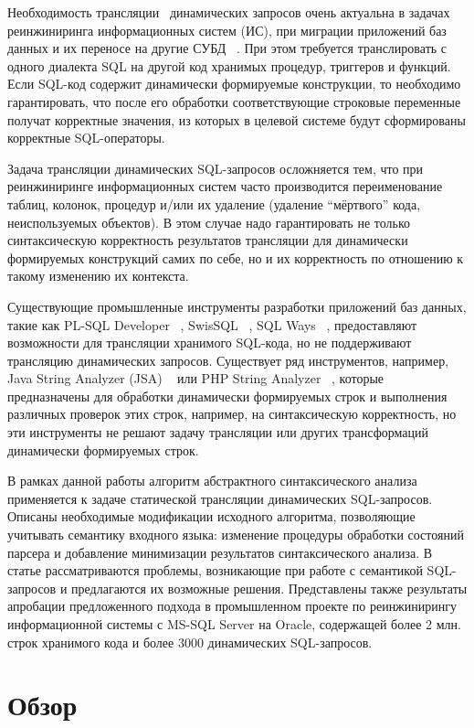 \documentclass{llncs}
\begin{document}
Необходимость трансляции~\cite{mart} динамических запросов очень актуальна в задачах реинжиниринга информационных систем (ИС), при миграции приложений баз данных и их переносе на другие СУБД ~\cite{NetDbTransform}. При этом требуется транслировать с одного диалекта SQL на другой код хранимых процедур, триггеров и функций. Если SQL-код содержит  динамически формируемые конструкции, то необходимо гарантировать, что после его обработки соответствующие строковые переменные получат корректные значения, из которых в целевой системе будут сформированы корректные SQL-операторы.

Задача трансляции динамических SQL-запросов осложняется тем, что при реинжиниринге информационных систем часто производится переименование таблиц, колонок, процедур и/или их удаление (удаление “мёртвого” кода, неиспользуемых объектов). В этом случае надо гарантировать не только синтаксическую корректность результатов трансляции для динамически формируемых конструкций самих по себе, но и их корректность по отношению к такому изменению их контекста.

Существующие промышленные инструменты разработки приложений баз данных, такие как PL-SQL Developer ~\cite{PLSQL}, SwisSQL ~\cite{SwissSQL}, SQL Ways ~\cite{SQLWays}, предоставляют возможности для трансляции хранимого SQL-кода, но не поддерживают трансляцию динамических запросов. Существует ряд инструментов, например, Java String Analyzer (JSA) ~\cite{JSA} или PHP String Analyzer ~\cite{PHPSA}, которые предназначены для обработки динамически формируемых строк и выполнения различных проверок этих строк, например, на синтаксическую корректность, но эти инструменты не решают задачу трансляции или других трансформаций динамически формируемых строк.

В рамках данной работы алгоритм абстрактного синтаксического анализа ~\cite{AbstrParsing} применяется к задаче статической трансляции динамических SQL-запросов. Описаны необходимые модификации исходного алгоритма, позволяющие учитывать семантику входного языка: изменение процедуры обработки состояний парсера и добавление минимизации результатов синтаксического анализа. В статье рассматриваются проблемы, возникающие при работе с семантикой SQL-запросов и предлагаются их возможные решения. Представлены также результаты апробации предложенного подхода в промышленном проекте по реинжинирингу  информационной системы с MS-SQL Server на Oracle, содержащей более 2 млн. строк хранимого кода и более 3000 динамических SQL-запросов.


\section{Обзор}
\end{document}
